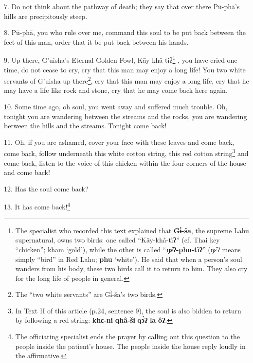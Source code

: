 7. Do not think about the pathway of death; they say that over there Pū-phā's
hills are precipitously steep.

8. Pū-phā, you who rule over me, command this soul to be put back between the
feet of this man, order that it be put back between his hands.

9. Up there, G'uisha's Eternal Golden Fowl, Kāy-khâ-tiʔ\footnote{The specialist who recorded this text explained that \textbf{G̈ɨ̀-ša}, the supreme Lahu supernatural, owns two birds: one called ``Kāy-khâ-tìʔ'' (cf. Thai key ``chicken''; kham `gold'), while the other is called ``\textbf{ŋɛ̂ʔ-phu-tìʔ}'' (ŋɛ̂ʔ means simply ``bird'' in Red Lahu; \textbf{phu} `white'). He said that when a person's soul wanders from his body, these two birds call it to return to him. They also cry for the long life of people in general.} , you have cried
one time, do not cease to cry, cry that this man may enjoy a long life! You two
white servants of G'uisha up there\footnote{The ``two white servants'' are G̈ɨ̀-ša's two birds.}, cry that this man may enjoy a long life,
cry that he may have a life like rock and stone, cry that he may come back here
again.

10. Some time ago, oh soul, you went away and suffered much trouble. Oh, tonight
you are wandering between the streams and the rocks, you are wandering between
the hills and the streams. Tonight come back!

11. Oh, if you are ashamed, cover your face with these leaves and come back, come
back, follow underneath this white cotton string, this red cotton string\footnote{In Text II of this article (p.24, sentence 9), the soul is also bidden to return by following a red string: \textbf{khɛ-ni} \textbf{qhâ-šɨ} \textbf{qɔ̀ʔ} \textbf{la} \textbf{ôʔ}.}
and come back, listen to the voice of this chicken within the four corners of the
house and come back!

12. Has the soul come back?

13. It has come back!\footnote{The officiating specialist ends the prayer by calling out this question to the people inside the patient's house. The people inside the house reply loudly in the affirmative.}

